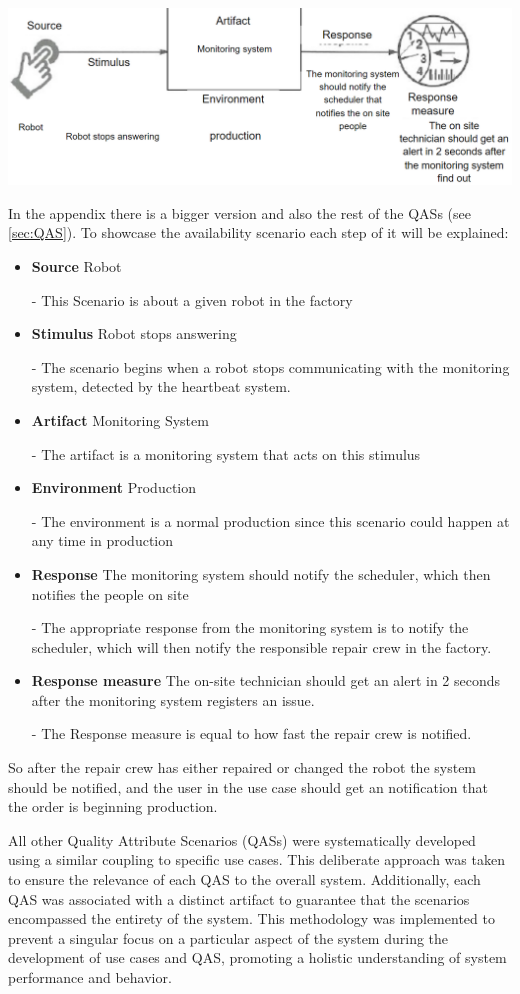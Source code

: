 \begin{center}
    \includegraphics[scale= 0.26]{Images/availability.png}
\end{center}
In the appendix there is a bigger version and also the rest of the QASs (see \ref{sec:QAS}).
To showcase the availability scenario each step of it will be explained:
\begin{itemize}
    \item \textbf{Source} Robot
    \item[-]This Scenario is about a given robot in the factory 
    \item \textbf{Stimulus} Robot stops answering
    \item[-] The scenario begins when a robot stops communicating with the monitoring system, detected by the heartbeat system.
    \item \textbf{Artifact} Monitoring System
    \item[-] The artifact is a monitoring system that acts on this stimulus
    \item \textbf{Environment} Production
    \item[-] The environment is a normal production since this scenario could happen at any time in production
    \item \textbf{Response} The monitoring system should notify the scheduler, which then notifies the people on site
    \item[-] The appropriate response from the monitoring system is to notify the scheduler, which will then notify the responsible repair crew in the factory.
    \item \textbf{Response measure} The on-site technician should get an alert in 2 seconds after the monitoring system registers an issue.
    \item[-] The Response measure is equal to how fast the repair crew is notified. 
\end{itemize}
So after the repair crew has either repaired or changed the robot the system should be notified, and the user in the use case should get an notification that the order is beginning production.

All other Quality Attribute Scenarios (QASs) were systematically developed using a similar coupling to specific use cases. This deliberate approach was taken to ensure the relevance of each QAS to the overall system. Additionally, each QAS was associated with a distinct artifact to guarantee that the scenarios encompassed the entirety of the system. This methodology was implemented to prevent a singular focus on a particular aspect of the system during the development of use cases and QAS, promoting a holistic understanding of system performance and behavior.
